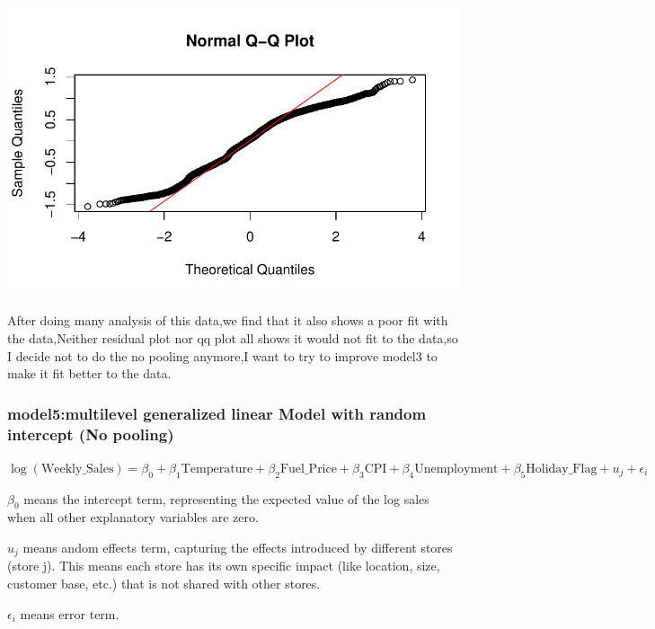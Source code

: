 \documentclass[
  letterpaper,
  DIV=11,
  numbers=noendperiod]{scrartcl}
\begin{document}
\includegraphics{678final_files/figure-pdf/unnamed-chunk-12-1.pdf}

After doing many analysis of this data,we find that it also shows a poor
fit with the data,Neither residual plot nor qq plot all shows it would
not fit to the data,so I decide not to do the no pooling anymore,I want
to try to improve model3 to make it fit better to the data.

\hypertarget{model5multilevel-generalized-linear-model-with-random-intercept-no-pooling}{%
\subsubsection{model5:multilevel generalized linear Model with random
intercept (No
pooling)}\label{model5multilevel-generalized-linear-model-with-random-intercept-no-pooling}}

\(\log(\text{Weekly_Sales}) = \beta_0 + \beta_1 \text{Temperature} + \beta_2 \text{Fuel_Price} + \beta_3 \text{CPI} + \beta_4 \text{Unemployment} + \beta_5 \text{Holiday_Flag} + u_j + \epsilon_i\)

\(\beta_0\) means the intercept term, representing the expected value of
the log sales when all other explanatory variables are zero.

\(u_j\) means andom effects term, capturing the effects introduced by
different stores (store j). This means each store has its own specific
impact (like location, size, customer base, etc.) that is not shared
with other stores.

\(\epsilon_i\) means error term.
\end{document}
